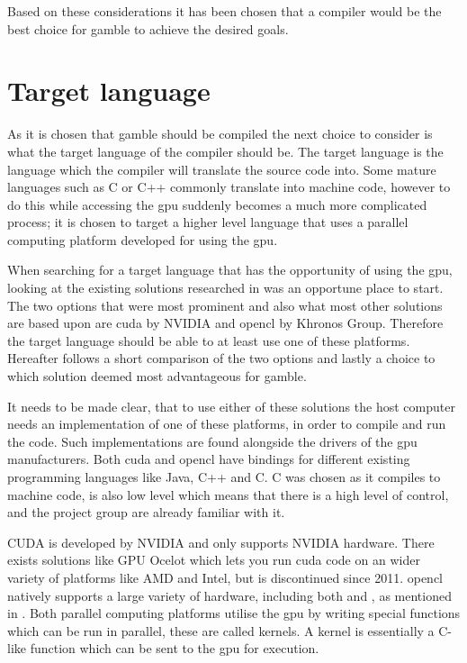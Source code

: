 Based on these considerations it has been chosen that a compiler would be the best choice for \gls{gamble} to achieve the desired goals.

\section{Target language}\label{CUDAvsOpenCL}
As it is chosen that \gls{gamble} should be compiled the next choice to consider is what the target language of the compiler should be.
The target language is the language which the compiler will translate the source code into.
Some mature languages such as C or C++ commonly translate into machine code, however to do this while accessing the \acrshort{gpu} suddenly becomes a much more complicated process; it is chosen to target a higher level language that uses a parallel computing platform developed for using the \acrshort{gpu}.

When searching for a target language that has the opportunity of using the \acrshort{gpu}, looking at the existing solutions researched in  was an opportune place to start.
The two options that were most prominent and also what most other solutions are based upon are \gls{cuda} by NVIDIA and \gls{opencl} by Khronos Group.
Therefore the target language should be able to at least use one of these platforms. 
Hereafter follows a short comparison of the two options and lastly a choice to which solution deemed most advantageous for \gls{gamble}.

It needs to be made clear, that to use either of these solutions the host computer needs an implementation of one of these platforms, in order to compile and run the code.
Such implementations are found alongside the drivers of the \gls{gpu} manufacturers.
Both \gls{cuda} and \gls{opencl} have bindings for different existing programming languages like Java, C++ and C.
C was chosen as it compiles to machine code, is also low level which means that there is a high level of control, and the project group are already familiar with it. 

CUDA is developed by NVIDIA and only supports NVIDIA hardware.
There exists solutions like GPU Ocelot which lets you run \gls{cuda} code on an wider variety of platforms like AMD and Intel, but is discontinued since 2011. \citep{Diamos:2010:ODO:1854273.1854318}
\gls{opencl} natively supports a large variety of hardware, including both  and , as mentioned in .
Both parallel computing platforms utilise the \acrshort{gpu} by writing special functions which can be run in parallel, these are called kernels.
A kernel is essentially a C-like function which can be sent to the \acrshort{gpu} for execution.

